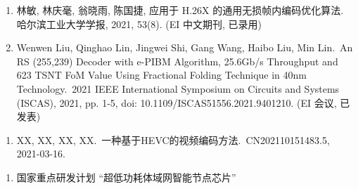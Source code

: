 \begin{publications}
    \begin{enumerate}
        \item 林敏, 林庆毫, 翁晓雨, 陈国捷,
              应用于 H.26X 的通用无损帧内编码优化算法.\,
              哈尔滨工业大学学报, 2021, 53(8). (EI 中文期刊, 已录用)

        \item Wenwen Liu, Qinghao Lin, Jingwei Shi, Gang Wang, Haibo Liu, Min Lin.\,
              An RS (255,239) Decoder with e-PIBM Algorithm, 25.6Gb/s Throughput and 623 TSNT FoM Value Using Fractional Folding Technique in 40nm Technology.\,
              2021 IEEE International Symposium on Circuits and Systems (ISCAS), 2021, pp. 1-5, doi: 10.1109/ISCAS51556.2021.9401210. (EI 会议, 已发表)
    \end{enumerate}

    \begin{enumerate}
        \item XX, XX, XX, XX.\,
              一种基于HEVC的视频编码方法.\,
              CN202110151483.5, 2021-03-16.
    \end{enumerate}

    \begin{enumerate}
        \item 国家重点研发计划 “超低功耗体域网智能节点芯片”
    \end{enumerate}
\end{publications}
